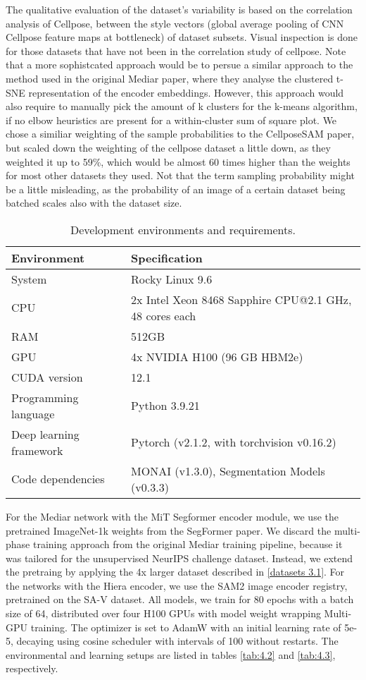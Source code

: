 The qualitative evaluation of the dataset's variability is based on the correlation analysis of Cellpose, between the style vectors (global average pooling of CNN Cellpose feature maps at bottleneck) of dataset subsets. Visual inspection is done for those datasets that have not been in the correlation study of cellpose. Note that a more sophistcated approach would be to persue a similar approach to the method used in the original Mediar paper, where they analyse the clustered t-SNE representation of the encoder embeddings. However, this approach would also require to manually pick the amount of k clusters for the k-means algorithm, if no elbow heuristics are present for a within-cluster sum of square plot. We chose a similiar weighting of the sample probabilities to the CellposeSAM paper, but scaled down the weighting of the cellpose dataset a little down, as they weighted it up to 59\%, which would be almost 60 times higher than the weights for most other datasets they used. Not that the term sampling probability might be a little misleading, as the probability of an image of a certain dataset being batched scales also with the dataset size.

\begin{table}[ht]
\centering
\footnotesize
\caption{Development environments and requirements.}
\begin{tabular}{l l}
\hline\hline
\textbf{Environment} & \textbf{Specification} \\
\hline
System & Rocky Linux 9.6 \\
CPU & 2x Intel Xeon 8468 Sapphire CPU@2.1 GHz, 48 cores each \\
RAM & 512GB\\
GPU & 4x NVIDIA H100 (96 GB HBM2e) \\
CUDA version & 12.1 \\
Programming language & Python 3.9.21 \\
Deep learning framework & Pytorch (v2.1.2, with torchvision v0.16.2) \\
Code dependencies & MONAI (v1.3.0), Segmentation Models (v0.3.3) \\
\hline
\end{tabular}
\end{table}

For the Mediar network with the MiT Segformer encoder module, we use the pretrained ImageNet-1k weights from the SegFormer paper. We discard the multi-phase training approach from the original Mediar training pipeline, because it was tailored for the unsupervised NeurIPS challenge dataset. Instead, we extend the pretraing by applying the 4x larger dataset described in \ref{datasets 3.1}. For the networks with the Hiera encoder, we use the SAM2 image encoder registry, pretrained on the SA-V dataset.
All models, we train for 80 epochs with a batch size of 64, distributed over four H100 GPUs with model weight wrapping Multi-GPU training. The optimizer is set to AdamW with an initial learning rate of 5e-5, decaying using cosine scheduler with intervals of 100 without restarts. The environmental and learning setups are listed in tables \ref{tab:4.2} and \ref{tab:4.3}, respectively. 


